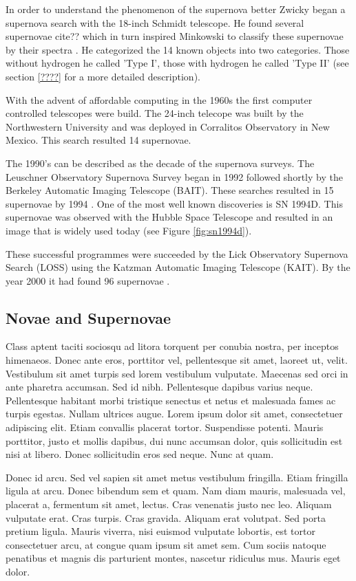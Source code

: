In order to understand the phenomenon of the supernova better Zwicky began a supernova search with the 18-inch Schmidt telescope. He found several supernovae cite?? which in turn inspired Minkowski to classify these supernovae by their spectra \citet{1941PASP...53..224M}. 
He categorized the 14 known objects into two categories. Those without hydrogen he called 'Type I', those with hydrogen he called 'Type II' (see section \ref{????} for a more detailed description).

With the advent of affordable computing in the 1960s the first computer controlled telescopes were build. The 24-inch telecope was built by the Northwestern University and was deployed in Corralitos Observatory in New Mexico. This search resulted 14 supernovae. 

The 1990's can be described as the decade of the supernova surveys. The Leuschner Observatory Supernova Survey began in 1992 followed shortly by the Berkeley Automatic Imaging Telescope (BAIT). These searches resulted in 15 supernovae by 1994 \citep{1994AAS...185.7905V}. One of the most well known discoveries is SN 1994D. This supernovae was observed with the Hubble Space Telescope and resulted in an image that is widely used today (see Figure \ref{fig:sn1994d}).

These successful programmes were succeeded by the Lick Observatory Supernova Search (LOSS) using the Katzman Automatic Imaging Telescope (KAIT). By the year 2000 it had found 96 supernovae \citep{2001ASPC..246..121F}.


\subsection{Novae and Supernovae}
\label{sec:novae_supernovae}

Class aptent taciti sociosqu ad litora torquent per conubia nostra,
per inceptos himenaeos. Donec ante eros, porttitor vel, pellentesque
sit amet, laoreet ut, velit. Vestibulum sit amet turpis sed lorem
vestibulum vulputate. Maecenas sed orci in ante pharetra accumsan. Sed
id nibh. Pellentesque dapibus varius neque. Pellentesque habitant
morbi tristique senectus et netus et malesuada fames ac turpis
egestas. Nullam ultrices augue. Lorem ipsum dolor sit amet,
consectetuer adipiscing elit. Etiam convallis placerat
tortor. Suspendisse potenti. Mauris porttitor, justo et mollis
dapibus, dui nunc accumsan dolor, quis sollicitudin est nisi at
libero. Donec sollicitudin eros sed neque. Nunc at quam.

Donec id arcu. Sed vel sapien sit amet metus vestibulum
fringilla. Etiam fringilla ligula at arcu. Donec bibendum sem et
quam. Nam diam mauris, malesuada vel, placerat a, fermentum sit amet,
lectus. Cras venenatis justo nec leo. Aliquam vulputate erat. Cras
turpis. Cras gravida. Aliquam erat volutpat. Sed porta pretium
ligula. Mauris viverra, nisi euismod vulputate lobortis, est tortor
consectetuer arcu, at congue quam ipsum sit amet sem. Cum sociis
natoque penatibus et magnis dis parturient montes, nascetur ridiculus
mus. Mauris eget dolor.

